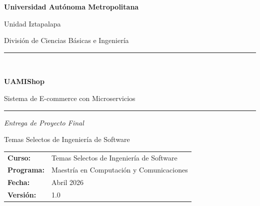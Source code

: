 \documentclass[12pt,a4paper]{article}
\begin{document}
\begin{titlepage}
  \centering
  \vspace*{1.5cm}

  {\Large\bfseries Universidad Aut\'onoma Metropolitana\par}
  \vspace{0.3cm}
  {\large Unidad Iztapalapa\par}
  \vspace{0.3cm}
  {\large Divisi\'on de Ciencias B\'asicas e Ingenier\'ia\par}

  \vspace{1.5cm}
  \rule{\linewidth}{0.8pt}\\[0.4cm]
  {\LARGE\bfseries UAMIShop\par}
  \vspace{0.3cm}
  {\Large Sistema de E-commerce con Microservicios\par}
  \rule{\linewidth}{0.8pt}

  \vspace{1.2cm}
  {\large\itshape Entrega de Proyecto Final\par}
  \vspace{0.5cm}
  {\normalsize Temas Selectos de Ingenier\'ia de Software\par}

  \vfill

  \begin{tabular}{ll}
    \textbf{Curso:}       & Temas Selectos de Ingenier\'ia de Software \\[4pt]
    \textbf{Programa:}    & Maestr\'ia en Computaci\'on y Comunicaciones \\[4pt]
    \textbf{Fecha:}       & Abril 2026 \\[4pt]
    \textbf{Versi\'on:}   & 1.0 \\
  \end{tabular}

  \vspace{1cm}
\end{titlepage}

\tableofcontents
\newpage

\end{document}
